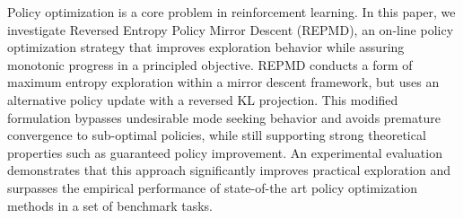 
Policy optimization is a core problem in reinforcement learning.
In this paper, 
we investigate Reversed Entropy Policy Mirror Descent (REPMD), 
an on-line policy optimization strategy that improves exploration behavior
while assuring monotonic progress in a principled objective.
REPMD conducts a form of maximum entropy exploration
within a mirror descent framework,
but uses an alternative policy update with a reversed KL projection.
This modified formulation bypasses undesirable mode seeking behavior
and avoids premature convergence to sub-optimal policies,
while still supporting strong theoretical properties
such as guaranteed policy improvement.
An experimental evaluation
demonstrates that this approach significantly improves practical exploration
and surpasses the empirical
performance of state-of-the art policy optimization methods
in a set of benchmark tasks.

